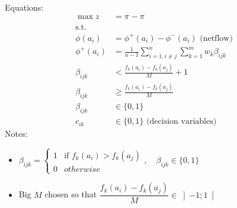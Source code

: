 \documentclass[a4paper]{article}
\begin{document}
    Equations:
    \begin{align*}
        \max z &= \pi_{} - \pi_{}\\
        \text{s.t.} & \\
        \phi(a_i) &= \phi^+(a_i) - \phi^-(a_i) \text{ (netflow)} \\
        \phi^+(a_i) &= \frac{1}{n-1} \sum_{i=1, i\neq j}^{n} \sum_{k=1}^{m} w_k \beta_{ijk} \\
        \beta_{ijk} &< \frac{f_k(a_i)-f_k(a_j)}{M} + 1 \\
        \beta_{ijk} &\geq \frac{f_k(a_i)-f_k(a_j)}{M} \\
        \beta_{ijk} &\in \{0,1\}\\
        c_{ik} &\in \{0, 1\} \text{ (decision variables)}
    \end{align*}
    Notes:
    \begin{itemize}
        \item $\beta_{ijk} = \begin{cases}
            1 & \text{if } f_k(a_i) > f_k(a_j) \\
            0 & otherwise
        \end{cases}, \quad \beta_{ijk} \in \{0, 1\}$
        \item Big $M$ chosen so that $\dfrac{f_k(a_i)-f_k(a_j)}{M} \in \left]-1;1\right[$
    \end{itemize}
\end{document}
